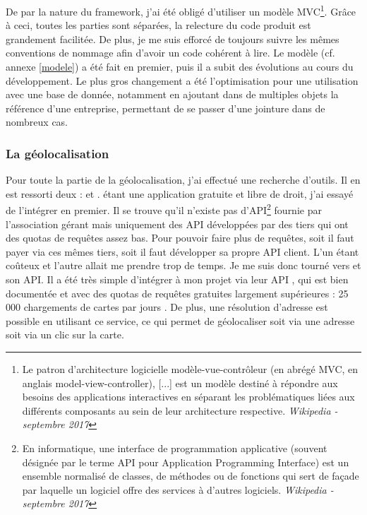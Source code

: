 \documentclass[a4paper, 11pt]{report}
\begin{document}
        De par la nature du framework, j'ai été obligé d'utiliser un modèle MVC\footnote{Le patron d'architecture logicielle modèle-vue-contrôleur (en abrégé MVC, en anglais model-view-controller), [...] est un modèle destiné à répondre aux besoins des applications interactives en séparant les problématiques liées aux différents composants au sein de leur architecture respective. \textit{Wikipedia - septembre 2017}}. Grâce à ceci, toutes les parties sont séparées, la relecture du code produit est grandement facilitée. De plus, je me suis efforcé de toujours suivre les mêmes conventions de nommage afin d'avoir un code cohérent à lire. Le modèle (cf. annexe \ref{modele}) a été fait en premier, puis il a subit des évolutions au cours du développement. Le plus gros changement a été l'optimisation pour une utilisation avec une base de donnée, notamment en ajoutant dans de multiples objets la référence d'une entreprise, permettant de se passer d'une jointure dans de nombreux cas.

    \subsubsection*{La géolocalisation}
        Pour toute la partie de la géolocalisation, j'ai effectué une recherche d'outils. Il en est ressorti deux : \osm\cite{osm} et \gmap\cite{gmap}. \osm étant une application gratuite et libre de droit, j'ai essayé de l'intégrer en premier. Il se trouve qu'il n'existe pas d'API\footnote{En informatique, une interface de programmation applicative (souvent désignée par le terme API pour Application Programming Interface) est un ensemble normalisé de classes, de méthodes ou de fonctions qui sert de façade par laquelle un logiciel offre des services à d'autres logiciels. \textit{Wikipedia - septembre 2017}} fournie par l'association gérant \osm mais uniquement des API développées par des tiers qui ont des quotas de requêtes assez bas. Pour pouvoir faire plus de requêtes, soit il faut payer via ces mêmes tiers, soit il faut développer sa propre API client. L'un étant coûteux et l'autre allait me prendre trop de temps. Je me suis donc tourné vers \gmap et son API. Il a été très simple d'intégrer \gmap à mon projet via leur API \js, qui est bien documentée et avec des quotas de requêtes gratuites largement supérieures : 25 000 chargements de cartes par jours \cite{gmap_prices}. De plus, une résolution d'adresse est possible en utilisant ce service, ce qui permet de géolocaliser soit via une adresse soit via un clic sur la carte.
\end{document}
